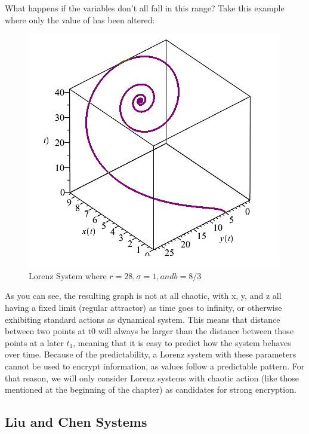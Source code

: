 \par What happens if the variables don't all fall in this range?  Take this example where only the value of \textsigma has been altered:
%
\begin{figure}[H]
    \centering
	\includegraphics[width=\linewidth]{Figures/lorenz_s2.png}
	\caption{Lorenz System where $r = 28, \sigma = 1, and b = 8/3$}
	\label{fig:badLorenz}
\end{figure}
%
As you can see, the resulting graph is not at all chaotic, with x, y, and z all having a fixed limit (regular attractor) as time goes to infinity, or otherwise exhibiting standard actions as dynamical system.  This means that distance between two points at t0 will always be larger than the distance between those points at a later $t_1$, meaning that it is easy to predict how the system behaves over time.  Because of the predictability, a Lorenz system with these parameters cannot be used to encrypt information, as values follow a predictable pattern.  For that reason, we will only consider Lorenz systems with chaotic action (like those mentioned at the beginning of the chapter) as candidates for strong encryption.

%
\subsection{Liu and Chen Systems}

